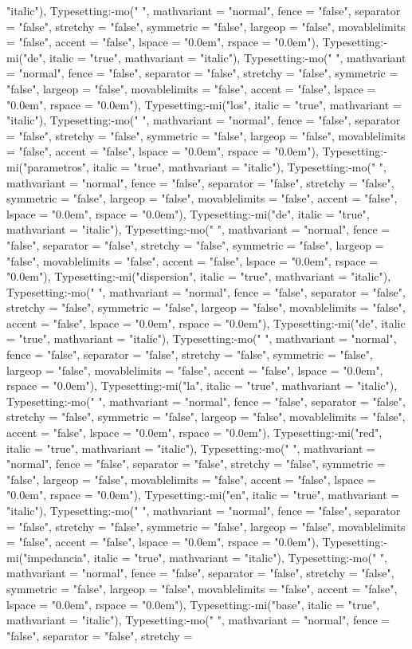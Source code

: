 \documentclass{article}
\begin{document}
\begin{Maple Normal}
{\begin{Maple Normal}
{"italic"), Typesetting:-mo(" ", mathvariant = "normal", fence = "false", separator = "false", stretchy = "false", symmetric = "false", largeop = "false", movablelimits = "false", accent = "false", lspace = "0.0em", rspace = "0.0em"), Typesetting:-mi("de", italic = "true", mathvariant = "italic"), Typesetting:-mo(" ", mathvariant = "normal", fence = "false", separator = "false", stretchy = "false", symmetric = "false", largeop = "false", movablelimits = "false", accent = "false", lspace = "0.0em", rspace = "0.0em"), Typesetting:-mi("los", italic = "true", mathvariant = "italic"), Typesetting:-mo(" ", mathvariant = "normal", fence = "false", separator = "false", stretchy = "false", symmetric = "false", largeop = "false", movablelimits = "false", accent = "false", lspace = "0.0em", rspace = "0.0em"), Typesetting:-mi("parametros", italic = "true", mathvariant = "italic"), Typesetting:-mo(" ", mathvariant = "normal", fence = "false", separator = "false", stretchy = "false", symmetric = "false", largeop = "false", movablelimits = "false", accent = "false", lspace = "0.0em", rspace = "0.0em"), Typesetting:-mi("de", italic = "true", mathvariant = "italic"), Typesetting:-mo(" ", mathvariant = "normal", fence = "false", separator = "false", stretchy = "false", symmetric = "false", largeop = "false", movablelimits = "false", accent = "false", lspace = "0.0em", rspace = "0.0em"), Typesetting:-mi("dispersion", italic = "true", mathvariant = "italic"), Typesetting:-mo(" ", mathvariant = "normal", fence = "false", separator = "false", stretchy = "false", symmetric = "false", largeop = "false", movablelimits = "false", accent = "false", lspace = "0.0em", rspace = "0.0em"), Typesetting:-mi("de", italic = "true", mathvariant = "italic"), Typesetting:-mo(" ", mathvariant = "normal", fence = "false", separator = "false", stretchy = "false", symmetric = "false", largeop = "false", movablelimits = "false", accent = "false", lspace = "0.0em", rspace = "0.0em"), Typesetting:-mi("la", italic = "true", mathvariant = "italic"), Typesetting:-mo(" ", mathvariant = "normal", fence = "false", separator = "false", stretchy = "false", symmetric = "false", largeop = "false", movablelimits = "false", accent = "false", lspace = "0.0em", rspace = "0.0em"), Typesetting:-mi("red", italic = "true", mathvariant = "italic"), Typesetting:-mo(" ", mathvariant = "normal", fence = "false", separator = "false", stretchy = "false", symmetric = "false", largeop = "false", movablelimits = "false", accent = "false", lspace = "0.0em", rspace = "0.0em"), Typesetting:-mi("en", italic = "true", mathvariant = "italic"), Typesetting:-mo(" ", mathvariant = "normal", fence = "false", separator = "false", stretchy = "false", symmetric = "false", largeop = "false", movablelimits = "false", accent = "false", lspace = "0.0em", rspace = "0.0em"), Typesetting:-mi("impedancia", italic = "true", mathvariant = "italic"), Typesetting:-mo(" ", mathvariant = "normal", fence = "false", separator = "false", stretchy = "false", symmetric = "false", largeop = "false", movablelimits = "false", accent = "false", lspace = "0.0em", rspace = "0.0em"), Typesetting:-mi("base", italic = "true", mathvariant = "italic"), Typesetting:-mo(" ", mathvariant = "normal", fence = "false", separator = "false", stretchy = }
\end{Maple Normal}}
\end{Maple Normal}
\end{document}
